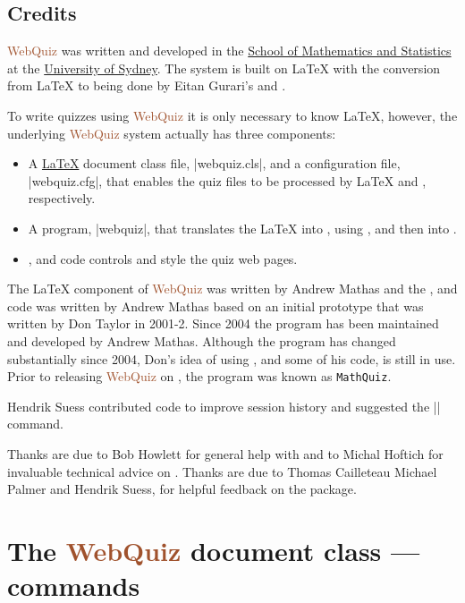\documentclass[svgnames]{article}
\newcommand\WebQuiz{\textcolor{Sienna}{WebQuiz}\xspace}
\newcommand\Ctan{\ctan[]{ctan}\xspace}
\begin{document}
  \subsection{Credits}
      \WebQuiz{} was written and developed in the
      \href{http://www.maths.usyd.edu.au/}{School of Mathematics and
      Statistics} at the \href{http://www.usyd.edu.au/}{University of
      Sydney}.  The system is built on \LaTeX{} with the conversion from
      \LaTeX{} to \HTML being done by Eitan Gurari's
      \TeXfht and .

      To write quizzes using \WebQuiz it is only necessary to know
      \LaTeX, however, the underlying \WebQuiz system actually has three
      components:
      \begin{itemize}
        \item A \href{https://www.latex-project.org/}{\LaTeX} document class
        file, \BashCode|webquiz.cls|, and a \TeXfht
        configuration file, \BashCode|webquiz.cfg|, that enables the
        quiz files to be processed by \LaTeX{} and \TeXfht, respectively.
        \item A \python program,
        \BashCode|webquiz|, that translates the
        \LaTeX{} into \XML, using \TeXfht, and then into \HTML.
        \item \CSS, \HTML and \Javascript code controls and style the
        quiz web pages.
      \end{itemize}

     The \LaTeX{} component of \WebQuiz{} was written by Andrew Mathas and
     the \python, \CSS and \Javascript code was written by Andrew Mathas
     based on an initial prototype that was written by Don Taylor in 2001-2.
     Since 2004 the program has been maintained and developed by Andrew
     Mathas. Although the program has changed substantially since 2004,
     Don's idea of using \TeXfht, and some of his code, is still
     in use. Prior to releasing \WebQuiz on \Ctan, the program was known
     as \texttt{MathQuiz}.

     Hendrik Suess contributed code to improve session history
     and suggested the \LatexCode|\qref| command.

     Thanks are due to Bob Howlett for general help with \CSS and to
     Michal Hoftich for invaluable technical advice on \TeXfht. Thanks
     are due to
        Thomas Cailleteau
        Michael Palmer and
        Hendrik Suess,
     for helpful feedback on the package.

   \section{The \WebQuiz document class ---  commands}
   \label{S:documentclass}
\end{document}
